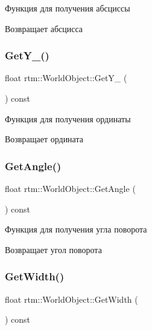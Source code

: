 Функция для получения абсциссы 

\begin{DoxyReturn}{Возвращает}
абсцисса 
\end{DoxyReturn}
\mbox{\label{classrtm_1_1_world_object_af558d23ff82794c8ace17b8aeefaf5bb}} 
\subsubsection{\texorpdfstring{Get\+Y\+\_\+()}{GetY\_()}}
{\footnotesize\ttfamily float rtm\+::\+World\+Object\+::\+Get\+Y\+\_\+ (\begin{DoxyParamCaption}{ }\end{DoxyParamCaption}) const}



Функция для получения ординаты 

\begin{DoxyReturn}{Возвращает}
ордината 
\end{DoxyReturn}
\mbox{\label{classrtm_1_1_world_object_ae9af0e03a3f49720b38ec69191c8d237}} 
\subsubsection{\texorpdfstring{Get\+Angle()}{GetAngle()}}
{\footnotesize\ttfamily float rtm\+::\+World\+Object\+::\+Get\+Angle (\begin{DoxyParamCaption}{ }\end{DoxyParamCaption}) const}



Функция для получения угла поворота 

\begin{DoxyReturn}{Возвращает}
угол поворота 
\end{DoxyReturn}
\mbox{\label{classrtm_1_1_world_object_a36a9cf3cce5c76f88164e0c790675a1e}} 
\subsubsection{\texorpdfstring{Get\+Width()}{GetWidth()}}
{\footnotesize\ttfamily float rtm\+::\+World\+Object\+::\+Get\+Width (\begin{DoxyParamCaption}{ }\end{DoxyParamCaption}) const}



